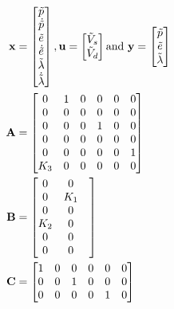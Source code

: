 \begin{subequations}
	\begin{align}
		\mbf{x} &= \begin{bmatrix}
			\tilde p\\
			\dot{\tilde p}\\
			\tilde e\\
			\dot{\tilde e}\\
			\tilde \lambda\\
			\dot{\tilde \lambda}
			\end{bmatrix}, 
		\mbf{u} = \begin{bmatrix}
			\tilde V_s\\
			\tilde V_d
			\end{bmatrix} \text{and} \ 
		\mbf{y} = \begin{bmatrix}
			\tilde p\\
			\tilde e\\
			\tilde \lambda
			\end{bmatrix}\\
		\mbf{A} &= \begin{bmatrix}
			0 & 1 & 0 & 0 & 0 & 0\\
			0 & 0 & 0 & 0 & 0 & 0\\ 
			0 & 0 & 0 & 1 & 0 & 0\\
			0 & 0 & 0 & 0 & 0 & 0\\
			0 & 0 & 0 & 0 & 0 & 1\\
			K_3 & 0 & 0 & 0 & 0 & 0
			\end{bmatrix}\\
		\mbf{B} &= \begin{bmatrix}
			0 & 0\\
			0 & K_1 &\\
			0 & 0\\
			K_2 & 0\\
			0 & 0\\
			0 & 0	
			\end{bmatrix}\\
		\mbf{C} &= \begin{bmatrix}
			1 & 0 & 0 & 0 & 0 & 0\\
			0 & 0 & 1 & 0 & 0 & 0\\
			0 & 0 & 0 & 0 & 1 & 0
			\end{bmatrix}
	\end{align}
\end{subequations}
